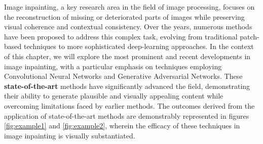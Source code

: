 
Image inpainting, a key research area in the field of image processing, focuses on the reconstruction of missing or deteriorated parts of images while preserving visual coherence and contextual consistency. Over the years, numerous methods have been proposed to address this complex task, evolving from traditional patch-based techniques to more sophisticated deep-learning approaches. In the context of this chapter, we will explore the most prominent and recent developments in image inpainting, with a particular emphasis on techniques employing Convolutional Neural Networks and Generative Adversarial Networks. These \textbf{state-of-the-art} methods have significantly advanced the field, demonstrating their ability to generate plausible and visually appealing content while overcoming limitations faced by earlier methods. The outcomes derived from the application of state-of-the-art methods are demonstrably represented in figures \ref{fig:example1} and \ref{fig:example2}, wherein the efficacy of these techniques in image inpainting is visually substantiated.


